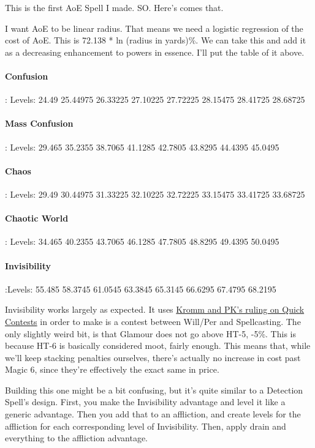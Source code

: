 \begin{multicols*}{2}
	This is the first AoE Spell I made. SO. Here's comes that.
	
	I want AoE to be linear radius. That means we need a logistic regression of the cost of AoE. This is 72.138 * ln (radius in yards)\%. We can take this and add it as a decreasing enhancement to powers in essence. I'll put the table of it above.
	
	\paragraph{Confusion}: Levels: 24.49 25.44975 26.33225 27.10225 27.72225 28.15475 28.41725 28.68725
	
	\paragraph{Mass Confusion}: Levels: 29.465 35.2355 38.7065 41.1285 42.7805 43.8295 44.4395 45.0495
	
	\paragraph{Chaos}: Levels: 29.49 30.44975 31.33225 32.10225 32.72225 33.15475 33.41725 33.68725
	
	\paragraph{Chaotic World}: Levels: 34.465 40.2355 43.7065 46.1285 47.7805 48.8295 49.4395 50.0495
	
	\paragraph{Invisibility}:Levels: 55.485 58.3745 61.0545 63.3845 65.3145 66.6295 67.4795 68.2195
	
	Invisibility works largely as expected. It uses \href{http://forums.sjgames.com/showpost.php?p=669736&postcount=2}{Kromm and PK's ruling on Quick Contests} in order to make is a contest between Will/Per and Spellcasting. The only slightly weird bit, is that Glamour does not go above HT-5, -5\%. This is because HT-6 is basically considered moot, fairly enough. This means that, while we'll keep stacking penalties ourselves, there's actually no increase in cost past Magic 6, since they're effectively the exact same in price.
	
	Building this one might be a bit confusing, but it's quite similar to  a Detection Spell's design. First, you make the Invisibility advantage and level it like a generic advantage. Then you add that to an affliction, and create levels for the affliction for each corresponding level of Invisibility. Then, apply drain and everything to the affliction advantage.
	

\end{multicols*}
